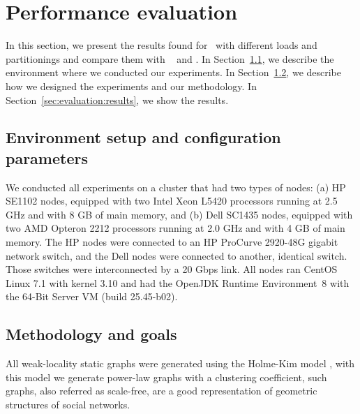 \section{Performance evaluation}
\label{sec:experiments}

In this section, we present the results found for \appname\ with different loads and partitionings and compare them with
\ssmr{}~\cite{bezerra2014ssmr} and \dssmr.
In Section~\ref{sec:evaluation:setup}, we describe the environment where we conducted our experiments.
In Section~\ref{sec:evaluation:methodology}, we describe how we designed the experiments and our methodology.
In Section~\ref{sec:evaluation:results}, we show the results.

\subsection{Environment setup and configuration parameters}
\label{sec:evaluation:setup}

We conducted all experiments on a cluster that had two types of nodes: (a) HP SE1102 nodes, equipped with two Intel Xeon L5420 processors running at 2.5 GHz and with 8 GB of main memory, and (b) Dell SC1435 nodes, equipped with two AMD Opteron 2212 processors running at 2.0 GHz and with 4 GB of main memory. The HP nodes were connected to an HP ProCurve 2920-48G gigabit network switch, and the Dell nodes were connected to another, identical switch. Those switches were interconnected by a 20 Gbps link.
All nodes ran CentOS Linux 7.1 with kernel 3.10 and had the OpenJDK Runtime Environment~8 with the \mbox{64-Bit} Server VM (build 25.45-b02).


\subsection{Methodology and goals}
\label{sec:evaluation:methodology}
All weak-locality static graphs were generated using the Holme-Kim model \cite{holme-kim}, with this model we generate
power-law graphs with a clustering coefficient, such graphs, also referred as scale-free, are a good representation
of geometric structures of social networks.


